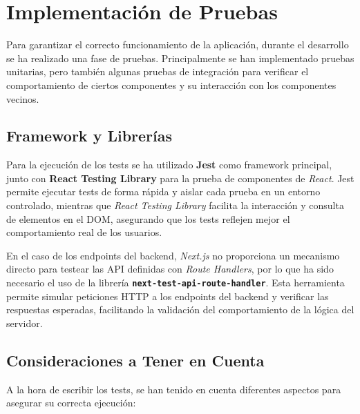 \section{Implementación de Pruebas}

Para garantizar el correcto funcionamiento de la aplicación, durante el desarrollo se ha realizado una fase de pruebas. Principalmente se han implementado pruebas unitarias, pero también algunas pruebas de integración para verificar el comportamiento de ciertos componentes y su interacción con los componentes vecinos.

\subsection{Framework y Librerías}

Para la ejecución de los tests se ha utilizado \textbf{Jest} como framework principal, junto con \textbf{React Testing Library} para la prueba de componentes de \textit{React}. Jest permite ejecutar tests de forma rápida y aislar cada prueba en un entorno controlado, mientras que \textit{React Testing Library} facilita la interacción y consulta de elementos en el DOM, asegurando que los tests reflejen mejor el comportamiento real de los usuarios.

En el caso de los endpoints del backend, \textit{Next.js} no proporciona un mecanismo directo para testear las API definidas con \textit{Route Handlers}, por lo que ha sido necesario el uso de la librería \textbf{\texttt{next-test-api-route-handler}}. Esta herramienta permite simular peticiones HTTP a los endpoints del backend y verificar las respuestas esperadas, facilitando la validación del comportamiento de la lógica del servidor.

\subsection{Consideraciones a Tener en Cuenta}

A la hora de escribir los tests, se han tenido en cuenta diferentes aspectos para asegurar su correcta ejecución:

